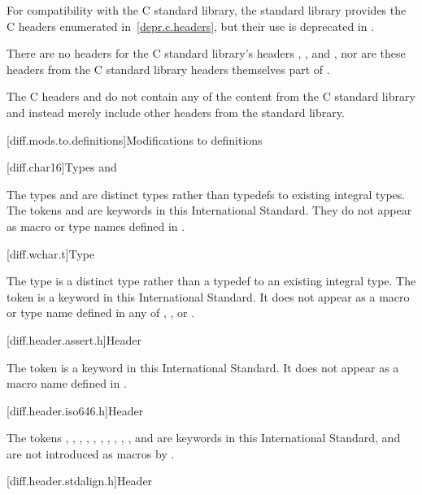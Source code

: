 \pnum
For compatibility with the C standard library,
the \Cpp{} standard library provides the C headers enumerated
in~\ref{depr.c.headers}, but their use is deprecated in \Cpp{}.

\pnum
There are no \Cpp{} headers for the C standard library's headers
,
,
and ,
nor are these headers from the C standard library headers themselves part of \Cpp{}.

\pnum
The C headers  and
 do not contain any of the content from
the C standard library and instead merely include other headers from the \Cpp{}
standard library.

[diff.mods.to.definitions]{Modifications to definitions}

[diff.char16]{Types  and }

\pnum
The types  and 
are distinct types rather than typedefs to existing integral types.
The tokens  and 
are keywords in this International Standard.
They do not appear as macro or type names defined in
.

[diff.wchar.t]{Type }

\pnum
The type  is a distinct type rather than a typedef to an
existing integral type.
The token 
is a keyword in this International Standard.
It does not appear as a macro or type name defined in any of
,
,
or .

[diff.header.assert.h]{Header }
%

\pnum
The token  is a keyword in this International
Standard. It does not appear as a macro name defined
in .

[diff.header.iso646.h]{Header }

\pnum
The tokens
,
,
,
,
,
,
,
,
,
,
and
are keywords in this International
Standard,
and are not introduced as macros
by .

[diff.header.stdalign.h]{Header }
%

